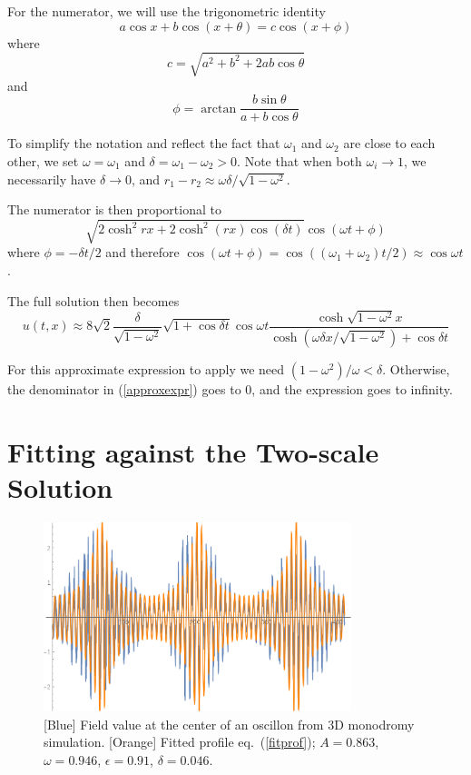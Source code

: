 \documentclass{report}
\begin{document}
For the numerator, we will use the trigonometric identity
\begin{equation}
  a\cos x + b \cos(x+\theta) = c \cos(x+\phi)
\end{equation}
where
\begin{equation}
  c = \sqrt{a^2+b^2+2ab\cos\theta}
\end{equation}
and
\begin{equation}
  \phi=\arctan \frac{b\sin\theta}{a+b\cos\theta}
\end{equation}

To simplify the notation and reflect the fact that $\omega_1$ and $\omega_2$ are close to each other, we set $\omega=\omega_1$ and $\delta=\omega_1-\omega_2>0$. Note that when both $\omega_i\to1$, we necessarily have $\delta\to0$, and $r_1-r_2\approx \omega \delta/\sqrt{1-\omega^2}$.

The numerator is then proportional to
\begin{equation}
  \sqrt{2\cosh^2 rx + 2\cosh^2 (rx) \cos(\delta t)}\cos(\omega t+\phi)
\end{equation}
where $\phi = -\delta t/2$ and therefore $\cos(\omega t+\phi)=\cos((\omega_1+\omega_2)t/2)\approx\cos\omega t$.

The full solution then becomes
\begin{equation}\label{approxexpr}
  u(t,x) \approx 8\sqrt{2}  \frac{\delta}{\sqrt{1-\omega^2}} \sqrt{1+\cos\delta t} \cos\omega t \frac{\cosh \sqrt{1-\omega^2} x}{\cosh(\omega\delta x/\sqrt{1-\omega^2}) + \cos \delta t}
\end{equation}

For this approximate expression to apply we need $(1-\omega^2)/\omega < \delta$. Otherwise, the denominator in  (\ref{approxexpr}) goes to 0, and the expression goes to infinity.

\section{Fitting against the Two-scale Solution}

\begin{figure}
  \centering
  \includegraphics[width=0.8\textwidth]{plot/simul-profile.png}
  \caption{[Blue] Field value at the center of an oscillon from 3D monodromy simulation. [Orange] Fitted profile eq.~(\ref{fitprof}); $A=0.863$, $\omega=0.946$, $\epsilon=0.91$,  $\delta=0.046$.}\label{simul-prof}
\end{figure}
\end{document}
